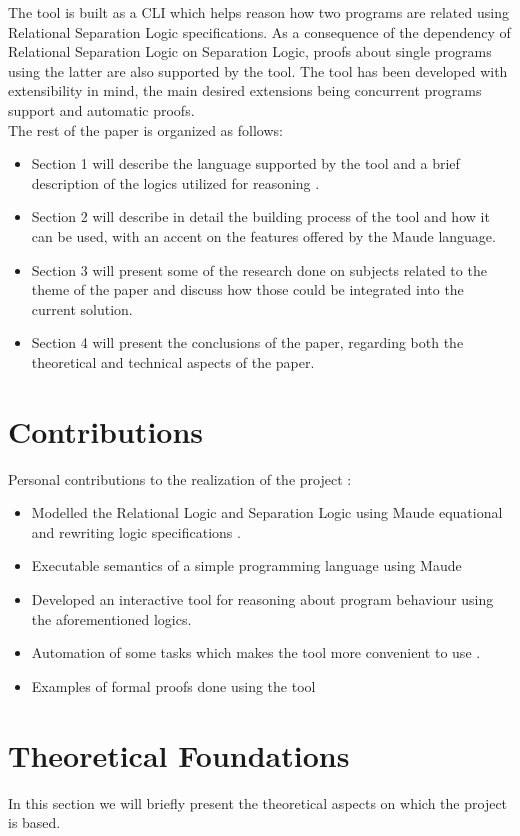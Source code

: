 \documentclass[12pt,a4paper]{article}
\begin{document}
The tool is built as a CLI which helps reason how two programs are related using Relational Separation Logic specifications. As a consequence of the dependency of Relational Separation Logic on Separation Logic, proofs about single programs using the latter are also supported by the tool. The tool has been developed with extensibility in mind, the main desired extensions being concurrent programs support and automatic proofs. \\

The rest of the paper is organized as follows: 
\begin{itemize}
	\item Section 1 will describe the language supported by the tool and a brief description of the logics utilized for reasoning .
	\item Section 2 will describe in detail the building process of the tool and how it can be used, with an accent on the features offered by the Maude language.
	\item Section 3 will present some of the research done on subjects related to the theme of the paper and discuss how those could be integrated into the current solution.
	\item Section 4 will present the conclusions of the paper, regarding both the theoretical and technical aspects of the paper.
\end{itemize}


\section{Contributions}
Personal contributions to the realization of the project : 
\begin{itemize}
	\item Modelled the Relational Logic and Separation Logic using Maude equational and rewriting logic specifications . 
	\item Executable semantics of a simple programming language using Maude
	\item Developed an interactive tool for reasoning about program behaviour using the aforementioned logics.
	\item Automation of some tasks which makes the tool more convenient to use .
	\item Examples of formal proofs done using the tool
\end{itemize}
\section{Theoretical Foundations}
In this section we will briefly present the theoretical aspects on which the project is based. 
\end{document}

